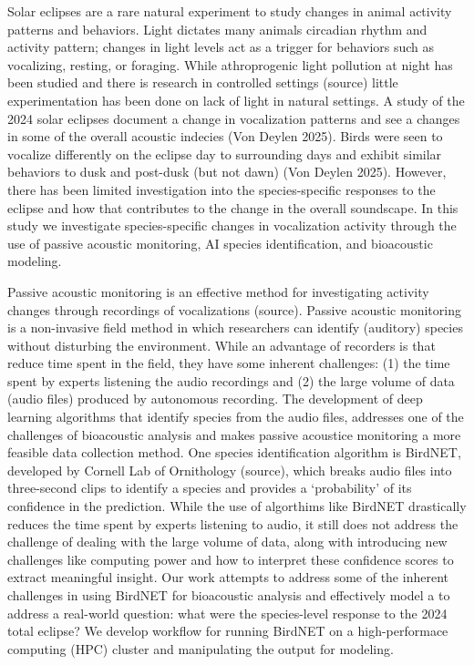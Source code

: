 \documentclass[
  letterpaper,
  DIV=11,
  numbers=noendperiod]{scrartcl}
\begin{document}
Solar eclipses are a rare natural experiment to study changes in animal
activity patterns and behaviors. Light dictates many animals circadian
rhythm and activity pattern; changes in light levels act as a trigger
for behaviors such as vocalizing, resting, or foraging. While
athroprogenic light pollution at night has been studied and there is
research in controlled settings (source) little experimentation has been
done on lack of light in natural settings. A study of the 2024 solar
eclipses document a change in vocalization patterns and see a changes in
some of the overall acoustic indecies (Von Deylen 2025). Birds were seen
to vocalize differently on the eclipse day to surrounding days and
exhibit similar behaviors to dusk and post-dusk (but not dawn) (Von
Deylen 2025). However, there has been limited investigation into the
species-specific responses to the eclipse and how that contributes to
the change in the overall soundscape. In this study we investigate
species-specific changes in vocalization activity through the use of
passive acoustic monitoring, AI species identification, and bioacoustic
modeling.

Passive acoustic monitoring is an effective method for investigating
activity changes through recordings of vocalizations (source). Passive
acoustic monitoring is a non-invasive field method in which researchers
can identify (auditory) species without disturbing the environment.
While an advantage of recorders is that reduce time spent in the field,
they have some inherent challenges: (1) the time spent by experts
listening the audio recordings and (2) the large volume of data (audio
files) produced by autonomous recording. The development of deep
learning algorithms that identify species from the audio files,
addresses one of the challenges of bioacoustic analysis and makes
passive acoustice monitoring a more feasible data collection method. One
species identification algorithm is BirdNET, developed by Cornell Lab of
Ornithology (source), which breaks audio files into three-second clips
to identify a species and provides a `probability' of its confidence in
the prediction. While the use of algorthims like BirdNET drastically
reduces the time spent by experts listening to audio, it still does not
address the challenge of dealing with the large volume of data, along
with introducing new challenges like computing power and how to
interpret these confidence scores to extract meaningful insight. Our
work attempts to address some of the inherent challenges in using
BirdNET for bioacoustic analysis and effectively model a to address a
real-world question: what were the species-level response to the 2024
total eclipse? We develop workflow for running BirdNET on a
high-performace computing (HPC) cluster and manipulating the output for
modeling.
\end{document}
